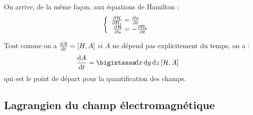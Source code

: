On arrive, de la même façon, aux équations de Hamilton :
$$
	\left\{\begin{array}{r@{\;}l}
		\frac{\partial \mathcal{H}}{\partial\Pi_t}&=\frac{\partial u}{\partial t}\\
		\frac{\partial \mathcal{H}}{\partial u}&=-\frac{\partial \Pi_t}{\partial t}
	\end{array}\right.
$$

\begin{remark}
	Tout comme on a $\frac{\mathrm{d} A}{\mathrm{d} t}=[H,A]$ si $A$ ne dépend pas explicitement du temps, on a :
	$$
		\frac{\dif A}{\dif t}=\bigintssss\!\dif x\,\dif y\,\dif z\,[\mathcal{H},A]
	$$
	qui est le point de départ pour la quantification des champs.
\end{remark}

\subsection{Lagrangien du champ électromagnétique}

